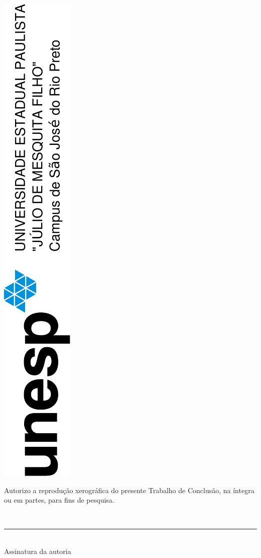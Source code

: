 \thispagestyle{empty}
\center
\centering \includegraphics[angle=-90]{unesp.pdf}
\vspace{2cm}

\begin{vplace}[1]
\par \centering {} 
\end{vplace}

\begin{vplace}[1]
	\par Autorizo a reprodução xerográfica do presente Trabalho de Conclusão, na íntegra ou em partes, para fins de pesquisa.
\end{vplace}

\begin{vplace}[1]
	\imprimirlocal\\

	\begin{center}
		\rule{0.3\linewidth}{1pt}\\
		Assinatura da autoria
	\end{center}
\end{vplace}



